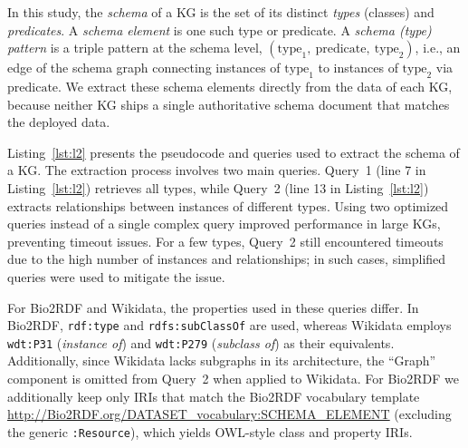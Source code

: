 \documentclass[sw]{iosart2x}
\begin{document}
In this study, the \emph{schema} of a KG is the set of its distinct \emph{types} (classes) and \emph{predicates}. A \emph{schema element} is one such type or predicate. A \emph{schema (type) pattern} is a triple pattern at the schema level, $(\text{type}_1,\ \text{predicate},\ \text{type}_2)$, i.e., an edge of the schema graph connecting instances of $\text{type}_1$ to instances of $\text{type}_2$ via $\text{predicate}$. We extract these schema elements directly from the data of each KG, because neither KG ships a single authoritative schema document that matches the deployed data.

Listing~\ref{lst:l2} presents the pseudocode and queries used to extract the schema of a KG. The extraction process involves two main queries. Query~1 (line 7 in Listing~\ref{lst:l2}) retrieves all types, while Query~2 (line 13 in Listing~\ref{lst:l2}) extracts relationships between instances of different types. Using two optimized queries instead of a single complex query improved performance in large KGs, preventing timeout issues. For a few types, Query~2 still encountered timeouts due to the high number of instances and relationships; in such cases, simplified queries were used to mitigate the issue.

For Bio2RDF and Wikidata, the properties used in these queries differ. In Bio2RDF, \texttt{rdf:type} and \texttt{rdfs:subClassOf} are used, whereas Wikidata employs \texttt{wdt:P31} (\emph{instance of}) and \texttt{wdt:P279} (\emph{subclass of}) as their equivalents. Additionally, since Wikidata lacks subgraphs in its architecture, the ``Graph'' component is omitted from Query~2 when applied to Wikidata. For Bio2RDF we additionally keep only IRIs that match the Bio2RDF vocabulary template \url{http://Bio2RDF.org/DATASET_vocabulary:SCHEMA_ELEMENT} (excluding the generic \texttt{:Resource}), which yields OWL-style class and property IRIs.
\end{document}
